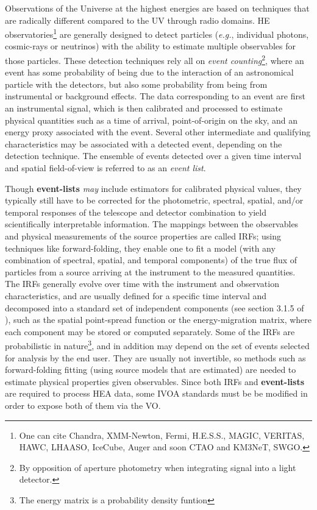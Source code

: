 \documentclass[11pt,a4paper]{ivoa}
\begin{document}
Observations of the Universe at the highest energies are based on techniques that are radically different compared to the UV through radio domains. \gls{HE} observatories\footnote{One can cite Chandra, XMM-Newton, Fermi, H.E.S.S., MAGIC, VERITAS, HAWC, LHAASO, IceCube, Auger and soon CTAO and KM3NeT, SWGO.} are generally designed to detect particles ({\em e.g.\/}, individual photons, cosmic-rays or neutrinos) with the ability to estimate multiple observables for those particles. These detection techniques rely all on \emph{event counting}\footnote{By opposition of aperture photometry when integrating signal into a light detector.}, where an event has some probability of being due to the interaction of an astronomical particle with the detectors, but also some probability from being from instrumental or background effects. The data corresponding to an event are first an instrumental signal, which is then calibrated and processed to estimate physical quantities such as a time of arrival, point-of-origin on the sky, and an energy proxy associated with the event. Several other intermediate and qualifying characteristics may be associated with a detected event, depending on the detection technique. The ensemble of events detected over a given time interval and spatial field-of-view is referred to as an \emph{event list}.

Though \textbf{event-lists} \emph{may} include estimators for calibrated physical values, they typically still have to be corrected for the photometric, spectral, spatial, and/or temporal responses of the telescope and detector combination to yield scientifically interpretable information. The mappings between the observables and physical measurements of the source properties are called \glspl{IRF}; using techniques like forward-folding, they enable one to fit a model (with any combination of spectral, spatial, and temporal components) of the true flux of particles from a source arriving at the instrument to the measured quantities. The \glspl{IRF} generally evolve over time with the instrument and observation characteristics, and are usually defined for a specific time interval and decomposed into a standard set of independent components (see section 3.1.5 of \citep{2024ivoa.note.heig}), such as the spatial point-spread function or the energy-migration matrix, where each component may be stored or computed separately.  Some of the \glspl{IRF} are probabilistic in nature\footnote{The energy matrix is a probability density funtion}, and in addition may depend on the set of events selected for analysis by the end user. They are usually not invertible, so methods such as forward-folding fitting (using source models that are estimated) are needed to estimate physical properties given observables. Since both \glspl{IRF} and \textbf{event-lists} are required to process \gls{HEA} data, some \gls{IVOA} standards must be be modified in order to expose both of them via the \gls{VO}.
\end{document}
